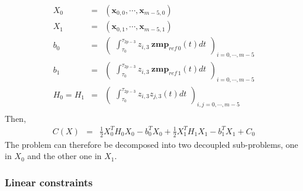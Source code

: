 \documentclass {article}
\newcommand\x{\mathbf{x}}
\newcommand\z{z}
\newcommand\zmprefx{\mathbf{zmp}_{ref\,0}}
\newcommand\zmprefy{\mathbf{zmp}_{ref\,1}}
\begin{document}
\begin{eqnarray*}
  X_0 &=& (\x_{0,0},\cdots,\x_{m-5,0}) \\
  X_1 &=& (\x_{0,1},\cdots,\x_{m-5,1}) \\
  b_0 &=& \left(\begin{array}{c}\int_{\tau_0}^{\tau_{2p-3}}\z_{i,3}\ \zmprefx(t)dt\end{array}\right)_{i=0,\cdots,m-5}\\
  b_1 &=& \left(\begin{array}{c}\int_{\tau_0}^{\tau_{2p-3}}\z_{i,3}\ \zmprefy(t)dt\end{array}\right)_{i=0,\cdots,m-5}\\
  H_0 = H_1 &=& \left(\begin{array}{c}
    \int_{\tau_0}^{\tau_{2p-3}} \z_{i,3} \z_{j,3}(t)dt \end{array}\right)_{i,j=0,\cdots,m-5} \\
\end{eqnarray*}
Then,
\begin{eqnarray*}
C(X) &=& \frac{1}{2}X_0^TH_0X_0 - b_0^T X_0 + \frac{1}{2}X_1^TH_1X_1 - b_1^T X_1 + C_0
\end{eqnarray*}
The problem can therefore be decomposed into two decoupled sub-problems, one in $X_0$ and the other one in $X_1$.

\subsubsection {Linear constraints}
\end{document}
